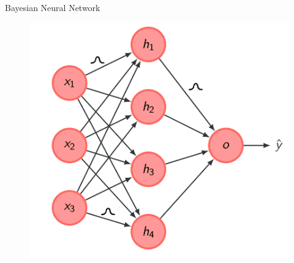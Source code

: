 \documentclass[10pt]{beamer}
\begin{document}
\begin{frame}[fragile]{Bayesian Neural Network}
    \begin{figure}[htp]
        \centering
        \includegraphics[scale=0.3]{images/bayesian_neural_network.png}
    \end{figure}
\end{frame}
\end{document}
